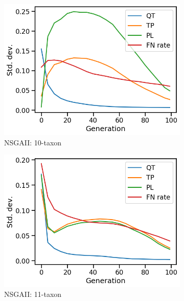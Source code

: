 \begin{figure}[!htbp]
	\centering
\begin{subfigure}[b]{0.33\textwidth}
			\includegraphics[width=\textwidth]{Figure/10-taxon_NSGAII_std_dev}
			\caption{NSGAII: 10-taxon}
\end{subfigure}\begin{subfigure}[b]{0.33\textwidth}
			\includegraphics[width=\textwidth]{Figure/11-taxon_NSGAII_std_dev}
			\caption{NSGAII: 11-taxon}
\end{subfigure}\begin{subfigure}[b]{0.33\textwidth}

\end{subfigure}
\end{figure}
